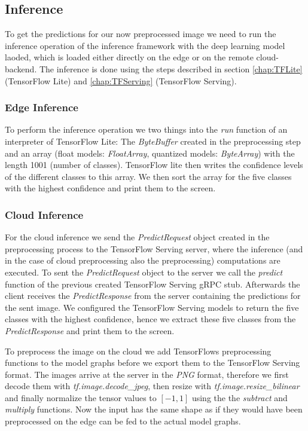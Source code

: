 

\subsection{Inference}
To get the predictions for our now preprocessed image we need to run the inference operation of the inference framework with the deep learning model laoded, which is loaded either directly on the edge or on the remote cloud-backend. 
The inference is done using the steps described in section \ref{chap:TFLite} (TensorFlow Lite) and \ref{chap:TFServing} (TensorFlow Serving).
\subsubsection{Edge Inference}
To perform the inference operation we two things into the \emph{run} function of an interpreter of TensorFlow Lite: The \emph{ByteBuffer} created in the preprocessing step and an array (float models: \emph{FloatArray}, quantized models: \emph{ByteArray}) with the length 1001 (number of classes). TensorFlow lite then writes the confidence levels of the different classes to this array. We then sort the array for the five classes with the highest confidence and print them to the screen.

\subsubsection{Cloud Inference}
\label{chap:CloudInfImpl}

For the cloud inference we send the \emph{PredictRequest} object created in the preprocessing process to the TensorFlow Serving server, where the inference (and in the case of cloud preprocessing also the preprocessing) computations are executed.
To sent the \emph{PredictRequest} object to the server we call the \emph{predict} function of the previous created TensorFlow Serving gRPC stub.
Afterwards the client receives the \emph{PredictResponse} from the server containing the predictions for the sent image. We configured the TensorFlow Serving models to return the five classes with the highest confidence, hence we extract these five classes from the \emph{PredictResponse} and print them to the screen.

To preprocess the image on the cloud we add TensorFlows preprocessing functions to the model graphs before we export them to the TensorFlow Serving format. The images arrive at the server in the \emph{PNG} format, therefore we first decode them with \emph{tf.image.decode\_jpeg}, then resize with \emph{tf.image.resize\_bilinear} and finally normalize the tensor values to $[-1,1]$ using the the \emph{subtract} and \emph{multiply} functions. Now the input has the same shape as if they would have been preprocessed on the edge can be fed to the actual model graphs.

